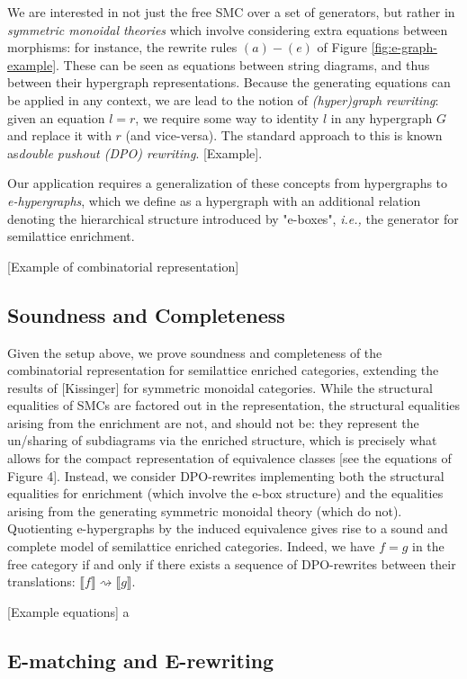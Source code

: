 We are interested in not just the free SMC over a set of generators, but rather in \textit{symmetric monoidal theories} which involve considering extra equations between morphisms: for instance, the rewrite rules $(a)-(e)$ of Figure \ref{fig:e-graph-example}. These can be seen as equations between string diagrams, and thus between their hypergraph representations. Because the generating equations can be applied in any context, we are lead to the notion of \textit{(hyper)graph rewriting}: given an equation $l=r$, we require some way to identity $l$ in any hypergraph $G$ and replace it with $r$ (and vice-versa). 
The standard approach to this is known as\textit{double pushout (DPO) rewriting}. [Example]. 

Our application requires a generalization of these concepts from hypergraphs to \textit{e-hypergraphs}, which we define as a hypergraph with an additional relation denoting the hierarchical structure introduced by "e-boxes", \textit{i.e.,} the generator for semilattice enrichment. 

[Example of combinatorial representation]

\subsection*{Soundness and Completeness}
Given the setup above, we prove soundness and completeness of the combinatorial representation for semilattice enriched categories, extending the results of [Kissinger] for symmetric monoidal categories. While the structural equalities of SMCs are factored out in the representation, the structural equalities arising from the enrichment are not, and should not be: they represent the un/sharing of subdiagrams via the enriched structure, which is precisely what allows for the compact representation of equivalence classes [see the equations of Figure 4]. Instead, we consider DPO-rewrites implementing both the structural equalities for enrichment (which involve the e-box structure) and the equalities arising from the generating symmetric monoidal theory (which do not). Quotienting e-hypergraphs by the induced equivalence gives rise to a sound and complete model of semilattice enriched categories. Indeed, we have $f = g$ in the free category if and only if there exists a sequence of DPO-rewrites between their translations: $\llbracket f \rrbracket \rightsquigarrow \llbracket g \rrbracket$. 

[Example equations]
a
\subsection*{E-matching and E-rewriting}

